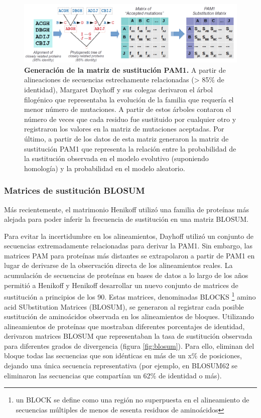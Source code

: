 \begin{figure}[htbp]
\centering
\includegraphics[width = \textwidth]{figs/pam-matrix.png}
\caption{\textbf{Generación de la matriz de sustitución PAM1.} A partir de alineaciones de secuencias estrechamente relacionadas (> 85\% de identidad), Margaret Dayhoff y sus colegas derivaron el árbol filogénico que representaba la evolución de la familia que requería el menor número de mutaciones. A partir de estos árboles contaron el número de veces que cada residuo fue sustituido por cualquier otro y registraron los valores en la matriz de mutaciones aceptadas. Por último, a partir de los datos de esta matriz generaron la matriz de sustitución PAM1 que representa la relación entre la probabilidad de la sustitución observada en el modelo evolutivo (suponiendo homología) y la probabilidad en el modelo aleatorio.}
\label{fig:pam}
\end{figure}

\subsubsection{Matrices de sustitución BLOSUM}
Más recientemente, el matrimonio Henikoff utilizó una familia de proteínas más alejada para poder inferir la frecuencia de sustitución en una matriz BLOSUM.

Para evitar la incertidumbre en los alineamientos, Dayhoff utilizó un conjunto de secuencias extremadamente relacionadas para derivar la PAM1. Sin embargo, las matrices PAM para proteínas más distantes se extrapolaron a partir de PAM1 en lugar de derivarse de la observación directa de los alineamientos reales. La acumulación de secuencias de proteínas en bases de datos a lo largo de los años permitió a Henikoff y Henikoff desarrollar un nuevo conjunto de matrices de sustitución a principios de los 90. Estas matrices, denominadas BLOCKS \footnote{un BLOCK se define como una región no superpuesta en el alineamiento de secuencias múltiples de menos de sesenta residuos de aminoácidos} amino acid SUbstitution Matrices (BLOSUM), se generaron al registrar cada posible sustitución de aminoácidos observada en los alineamientos de bloques. Utilizando alineamientos de proteínas que mostraban diferentes porcentajes de identidad, derivaron matrices BLOSUM que representaban la tasa de sustitución observada para diferentes grados de divergencia (figura \ref{fig:blosum}). Para ello, eliminan del bloque todas las secuencias que son idénticas en más de un x\% de posiciones, dejando una única secuencia representativa (por ejemplo, en BLOSUM62 se eliminaron las secuencias que compartían un 62\% de identidad o más). 

